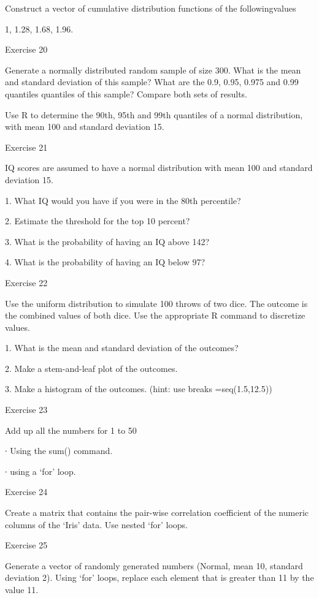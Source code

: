 Construct a vector of cumulative distribution functions of the followingvalues

1, 1.28, 1.68, 1.96.

 

Exercise 20

 

Generate a normally distributed random sample of size 300. What is the mean and standard deviation of this sample? What are the 0.9, 0.95, 0.975 and 0.99 quantiles quantiles of this sample? Compare both sets of results.

 

Use R to determine the 90th, 95th and 99th quantiles of a normal distribution, with mean 100 and standard deviation 15.

 

Exercise 21

 

IQ scores are assumed to have a normal distribution with mean 100 and standard deviation 15.

 
1.
What IQ would you have if you were in the 80th percentile?

2.
Estimate the threshold for the top 10 percent?

3.
What is the probability of having an IQ above 142?

4.
What is the probability of having an IQ below 97?


 

 

Exercise 22

 

Use the uniform distribution to simulate 100 throws of two dice. The outcome is the combined values of both dice. Use the appropriate R command to discretize values.

 
1.
What is the mean and standard deviation of the outcomes?

2.
Make a stem-and-leaf plot of the outcomes.

3.
Make a histogram of the outcomes. (hint: use breaks =seq(1.5,12.5))


 

Exercise 23

 

Add up all the numbers for 1 to 50

∙       Using the sum() command.

∙       using a ‘for’ loop.

 

Exercise 24

Create a matrix that contains the pair-wise correlation coefficient of the numeric columns of the ‘Iris’ data. Use nested ‘for’ loops.

 

Exercise 25

Generate a vector of randomly generated numbers (Normal, mean 10, standard deviation 2). Using ‘for’ loops, replace each element that is greater than 11 by the value 11.

 

 

